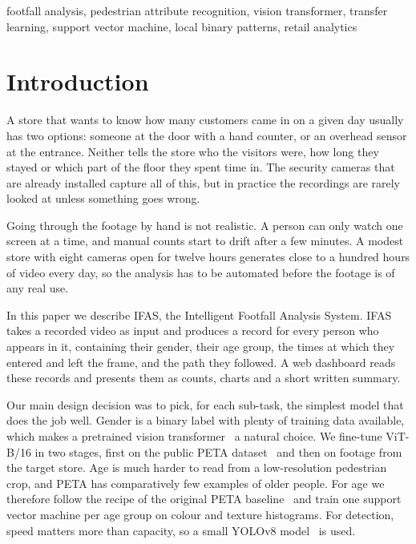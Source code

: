 \documentclass[conference]{IEEEtran}
\begin{document}
\begin{IEEEkeywords}
footfall analysis, pedestrian attribute recognition, vision transformer, transfer
learning, support vector machine, local binary patterns, retail analytics
\end{IEEEkeywords}

\section{Introduction}

A store that wants to know how many customers came in on a given day usually has
two options: someone at the door with a hand counter, or an overhead sensor at the
entrance. Neither tells the store who the visitors were, how long they stayed or
which part of the floor they spent time in. The security cameras that are already
installed capture all of this, but in practice the recordings are rarely looked at
unless something goes wrong.

Going through the footage by hand is not realistic. A person can only watch one
screen at a time, and manual counts start to drift after a few minutes. A modest
store with eight cameras open for twelve hours generates close to a hundred hours
of video every day, so the analysis has to be automated before the footage is of
any real use.

In this paper we describe IFAS, the Intelligent Footfall Analysis System. IFAS
takes a recorded video as input and produces a record for every person who appears
in it, containing their gender, their age group, the times at which they entered
and left the frame, and the path they followed. A web dashboard reads these
records and presents them as counts, charts and a short written summary.

Our main design decision was to pick, for each sub-task, the simplest model that
does the job well. Gender is a binary label with plenty of training data
available, which makes a pretrained vision transformer~\cite{dosovitskiy2021vit} a
natural choice. We fine-tune ViT-B/16 in two stages, first on the public PETA
dataset~\cite{deng2014peta} and then on footage from the target store. Age is much
harder to read from a low-resolution pedestrian crop, and PETA has comparatively
few examples of older people. For age we therefore follow the recipe of the
original PETA baseline~\cite{deng2014peta} and train one support vector machine
per age group on colour and texture histograms. For detection, speed matters more
than capacity, so a small YOLOv8 model~\cite{jocher2023yolov8} is used.
\end{document}
